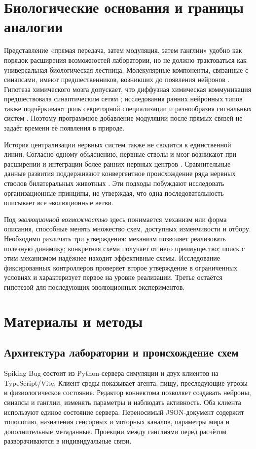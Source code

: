 \documentclass[11pt]{article}
\begin{document}
\section{Биологические основания и границы аналогии}
Представление «прямая передача, затем модуляция, затем ганглии» удобно как порядок расширения возможностей лаборатории, но не должно трактоваться как универсальная биологическая лестница. Молекулярные компоненты, связанные с синапсами, имеют предшественников, возникших до появления нейронов \citep{ryan2009}. Гипотеза химического мозга допускает, что диффузная химическая коммуникация предшествовала синаптическим сетям \citep{jekely2021}; исследования ранних нейронных типов также подчёркивают роль секреторной специализации и разнообразия сигнальных систем \citep{burkhardt2021}. Поэтому программное добавление модуляции после прямых связей не задаёт времени её появления в природе.

История централизации нервных систем также не сводится к единственной линии. Согласно одному объяснению, нервные стволы и мозг возникают при расширении и интеграции более ранних нервных центров \citep{arendt2016}. Сравнительные данные развития поддерживают конвергентное происхождение ряда нервных стволов билатеральных животных \citep{martin2018}. Эти подходы побуждают исследовать организационные принципы, не утверждая, что одна последовательность описывает все эволюционные ветви.

Под \emph{эволюционной возможностью} здесь понимается механизм или форма описания, способные менять множество схем, доступных изменчивости и отбору. Необходимо различать три утверждения: механизм позволяет реализовать полезную динамику; конкретная схема получает от него преимущество; поиск с этим механизмом надёжнее находит эффективные схемы. Исследование фиксированных контроллеров проверяет второе утверждение в ограниченных условиях и характеризует первое на уровне реализации. Третье остаётся гипотезой для последующих эволюционных экспериментов.

\section{Материалы и методы}
\subsection{Архитектура лаборатории и происхождение схем}
Spiking Bug состоит из Python-сервера симуляции и двух клиентов на TypeScript/Vite. Клиент среды показывает агента, пищу, преследующие угрозы и физиологическое состояние. Редактор коннектома позволяет создавать нейроны, синапсы и ганглии, изменять параметры и наблюдать активность. Оба клиента используют единое состояние сервера. Переносимый JSON-документ содержит топологию, назначения сенсорных и моторных каналов, параметры мира и дополнительные метаданные. Проекции между ганглиями перед расчётом разворачиваются в индивидуальные связи.
\end{document}
